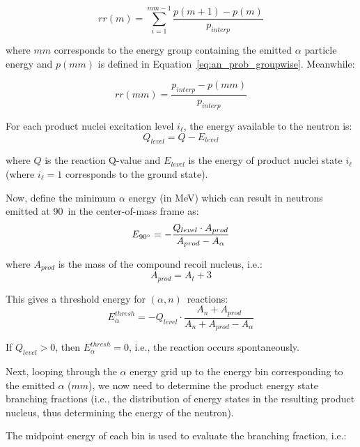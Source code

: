\documentclass[10pt]{article}
\newcommand{\alphn}[0]{$\left(\alpha,n\right)$}
\begin{document}
\begin{equation}
rr\left(m\right) = \sum_{i=1}^{mm-1} \frac{ p\left(m+1\right) - p\left(m\right) }{p_{interp}} 
\end{equation}

where $mm$ corresponds to the energy group containing the emitted $\alpha$ particle energy and $p\left(mm\right)$ is defined in Equation~\eqref{eq:an_prob_groupwise}. Meanwhile:

\begin{equation}
rr\left(mm\right)=\frac{p_{interp} - p\left( mm\right) }{p_{interp}}
\end{equation}

For each product nuclei excitation level $i_\ell$, the energy available to the neutron is:
\begin{equation}
Q_{level} = Q-E_{level}
\end{equation}

where $Q$ is the reaction Q-value and $E_{level}$ is the energy of product nuclei state $i_\ell$ (where $i_\ell=1$ corresponds to the ground state).

Now, define the minimum $\alpha$ energy (in MeV) which can result in neutrons emitted at 90\degree\ in the center-of-mass frame as:
\begin{equation}
E_{90\degree} = -\frac{Q_{level} \cdot A_{prod}}{A_{prod}-A_\alpha} 
\end{equation}

where $A_{prod}$ is the mass of the compound recoil nucleus, i.e.:
\begin{equation}
A_{prod} =  A_t + 3
\end{equation}

This gives a threshold energy for \alphn\ reactions:
\begin{equation}
E_\alpha^{thresh} = - Q_{level} \cdot \frac{ A_n + A_{prod}}{A_n + A_{prod} - A_\alpha} 
\end{equation}


If $Q_{level} > 0$, then $E_\alpha^{thresh}=0$, i.e., the reaction occurs spontaneously.

Next, looping through the $\alpha$ energy grid up to the energy bin corresponding to the emitted $\alpha$ ($mm$), we now need to determine the product energy state branching fractions (i.e., the distribution of energy states in the resulting product nucleus, thus determining the energy of the neutron).

The midpoint energy of each bin is used to evaluate the branching fraction, i.e.:
\end{document}
